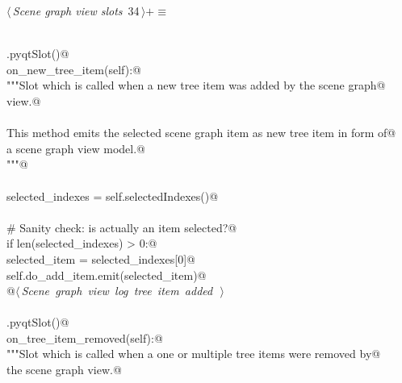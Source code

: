 \documentclass[
    a4paper,      %
    10pt,         %
    openright,    %
    notitlepage,  %
    parskip=half, %
]{scrreprt}       %
\theoremstyle{definition}                    %
\begin{document}
\begin{flushleft} \small
\begin{minipage}{\linewidth}\label{scrap40}\raggedright\small
{} $\langle\,${\itshape Scene graph view slots}\nobreak\ {\footnotesize {34}}$\,\rangle+\equiv$
\vspace{-1ex}
\begin{list}{}{} \item
\mbox{}\lstinline@@\\
\mbox{}\lstinline@QtCore.pyqtSlot()@\\
\mbox{}\lstinline@def on_new_tree_item(self):@\\
\mbox{}\lstinline@    """Slot which is called when a new tree item was added by the scene graph@\\
\mbox{}\lstinline@    view.@\\
\mbox{}\lstinline@@\\
\mbox{}\lstinline@    This method emits the selected scene graph item as new tree item in form of@\\
\mbox{}\lstinline@    a scene graph view model.@\\
\mbox{}\lstinline@    """@\\
\mbox{}\lstinline@@\\
\mbox{}\lstinline@    selected_indexes = self.selectedIndexes()@\\
\mbox{}\lstinline@@\\
\mbox{}\lstinline@    # Sanity check: is actually an item selected?@\\
\mbox{}\lstinline@    if len(selected_indexes) > 0:@\\
\mbox{}\lstinline@        selected_item = selected_indexes[0]@\\
\mbox{}\lstinline@        self.do_add_item.emit(selected_item)@\\
\mbox{}\lstinline@        @\hbox{$\langle\,${\itshape Scene graph view log tree item added}\nobreak\ {\footnotesize {}}$\,\rangle$}\lstinline@@\\
\mbox{}\lstinline@@\\
\mbox{}\lstinline@QtCore.pyqtSlot()@\\
\mbox{}\lstinline@def on_tree_item_removed(self):@\\
\mbox{}\lstinline@    """Slot which is called when a one or multiple tree items were removed by@\\
\mbox{}\lstinline@    the scene graph view.@\\
\mbox{}\lstinline@@\\

\end{list}
\end{minipage}
\end{flushleft}
\end{document}
